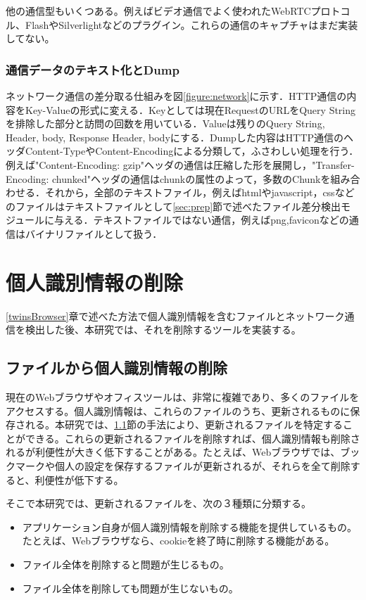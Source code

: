 \documentclass[submit,techrep]{ipsj}
\begin{document}
他の通信型もいくつある。例えばビデオ通信でよく使われたWebRTCプロトコル、FlashやSilverlightなどのプラグイン。これらの通信のキャプチャはまだ実装してない。

\subsubsection{通信データのテキスト化とDump}

ネットワーク通信の差分取る仕組みを図\ref{figure:network}に示す．HTTP通信の内容をKey-Valueの形式に変える．Keyとしては現在RequestのURLをQuery Stringを排除した部分と訪問の回数を用いている．Valueは残りのQuery String, Header, body, Response Header, bodyにする．Dumpした内容はHTTP通信のヘッダContent-TypeやContent-Encodingによる分類して，ふさわしい処理を行う．例えば"Content-Encoding: gzip"ヘッダの通信は圧縮した形を展開し，"Transfer-Encoding: chunked"ヘッダの通信はchunkの属性のよって，多数のChunkを組み合わせる．それから，全部のテキストファイル，例えばhtmlやjavascript，cssなどのファイルはテキストファイルとして\ref{sec:prep}節で述べたファイル差分検出モジュールに与える．テキストファイルではない通信，例えばpng,faviconなどの通信はバイナリファイルとして扱う．



\section{個人識別情報の削除}

\ref{twinsBrowser}章で述べた方法で個人識別情報を含むファイルとネットワーク通信を検出した後、本研究では、それを削除するツールを実装する。

\subsection{ファイルから個人識別情報の削除}

現在のWebブラウザやオフィスツールは、非常に複雑であり、多くのファイルをアクセスする。個人識別情報は、これらのファイルのうち、更新されるものに保存される。本研究では、\ref{}節の手法により、更新されるファイルを特定することができる。これらの更新されるファイルを削除すれば、個人識別情報も削除されるが利便性が大きく低下することがある。たとえば、Webブラウザでは、ブックマークや個人の設定を保存するファイルが更新されるが、それらを全て削除すると、利便性が低下する。

そこで本研究では、更新されるファイルを、次の３種類に分類する。
\begin{itemize}
\item
アプリケーション自身が個人識別情報を削除する機能を提供しているもの。たとえば、Webブラウザなら、cookieを終了時に削除する機能がある。
\item
ファイル全体を削除すると問題が生じるもの。
\item
ファイル全体を削除しても問題が生じないもの。
\end{itemize}
\end{document}
